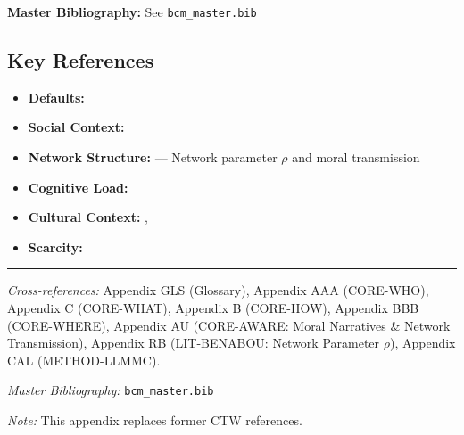 \begin{tcolorbox}[colback=blue!5!white, colframe=blue!75!black]
\textbf{Master Bibliography:} See \texttt{bcm\_master.bib}
\end{tcolorbox}

\subsection{Key References}

\begin{itemize}[nosep]
\item \textbf{Defaults:} \citet{johnson2003defaults}
\item \textbf{Social Context:} \citet{ariely2009doing}
\item \textbf{Network Structure:} \citet{benabou_2018_narratives} --- Network parameter $\rho$ and moral transmission
\item \textbf{Cognitive Load:} \citet{kahneman2011thinking}
\item \textbf{Cultural Context:} \citet{wang2017cultural}, \citet{hofstede2010cultures}
\item \textbf{Scarcity:} \citet{mullainathan2013scarcity}
\end{itemize}

\nocite{bcm_master}


\vspace{1em}
\hrule
\vspace{0.5em}

\noindent\textit{Cross-references:}
Appendix GLS (Glossary),
Appendix AAA (CORE-WHO),
Appendix C (CORE-WHAT),
Appendix B (CORE-HOW),
Appendix BBB (CORE-WHERE),
Appendix AU (CORE-AWARE: Moral Narratives \& Network Transmission),
Appendix RB (LIT-BENABOU: Network Parameter $\rho$),
Appendix CAL (METHOD-LLMMC).

\noindent\textit{Master Bibliography:} \texttt{bcm\_master.bib}

\noindent\textit{Note:} This appendix replaces former CTW references.


